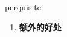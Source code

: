 
\begin{frame}
{\huge perquisite}
\begin{center}
\begin{enumerate}\Large
  \item \textbf{额外的好处}
\end{enumerate}
\end{center}
\end{frame}
